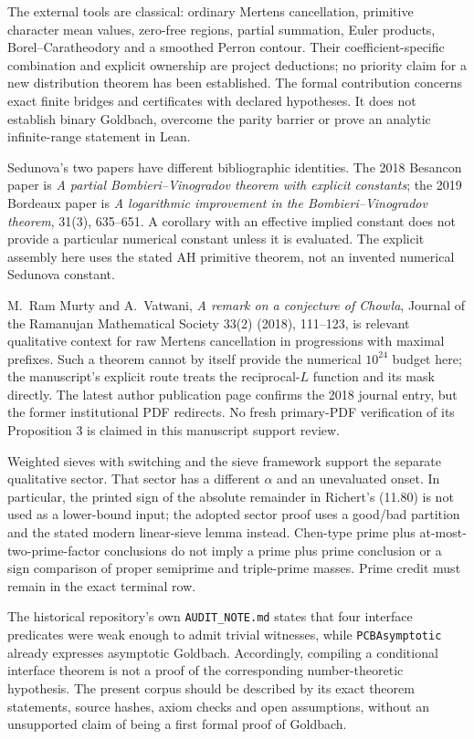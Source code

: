 \documentclass[11pt,a4paper]{article}
\theoremstyle{definition}
\theoremstyle{remark}
\begin{document}
The external tools are classical: ordinary Mertens cancellation,
primitive character mean values, zero-free regions, partial summation,
Euler products, Borel--Caratheodory and a smoothed Perron contour.
Their coefficient-specific combination and explicit ownership are
project deductions; no priority claim for a new distribution theorem
has been established. The formal contribution concerns exact finite
bridges and certificates with declared hypotheses. It does not establish
binary Goldbach, overcome the parity barrier or prove an analytic
infinite-range statement in Lean.

Sedunova's two papers have different bibliographic identities. The
2018 Besancon paper is \emph{A partial Bombieri--Vinogradov theorem
with explicit constants}; the 2019 Bordeaux paper \cite{Sedunova} is
\emph{A logarithmic improvement in the Bombieri--Vinogradov theorem},
31(3), 635--651. A corollary with an effective implied constant does
not provide a particular numerical constant unless it is evaluated.
The explicit assembly here uses the stated AH primitive theorem,
not an invented numerical Sedunova constant.

M.~Ram Murty and A.~Vatwani, \emph{A remark on a conjecture of Chowla},
Journal of the Ramanujan Mathematical Society 33(2) (2018), 111--123,
is relevant qualitative context for raw
Mertens cancellation in progressions with maximal prefixes. Such a
theorem cannot by itself provide the numerical $10^{24}$ budget here;
the manuscript's explicit route treats the reciprocal-$L$ function
and its mask directly. The latest author publication page confirms
the 2018 journal entry, but the former institutional PDF redirects.
No fresh primary-PDF verification of its Proposition 3 is claimed in
this manuscript support review.

Weighted sieves with switching \cite{MTZ} and the sieve framework
\cite{Richert} support the separate qualitative sector. That sector
has a different $\alpha$ and an unevaluated onset. In particular, the
printed sign of the absolute remainder in Richert's (11.80) is not
used as a lower-bound input; the adopted sector proof uses a good/bad
partition and the stated modern linear-sieve lemma instead. Chen-type
prime plus at-most-two-prime-factor conclusions do not imply a prime
plus prime conclusion or a sign comparison of proper semiprime and
triple-prime masses. Prime credit must remain in the exact terminal row.

The historical repository's own \texttt{AUDIT\_NOTE.md} states that
four interface predicates were weak enough to admit trivial witnesses,
while \texttt{PCBAsymptotic} already expresses asymptotic Goldbach.
Accordingly, compiling a conditional interface theorem is not a proof
of the corresponding number-theoretic hypothesis. The present corpus
should be described by its exact theorem statements, source hashes,
axiom checks and open assumptions, without an unsupported claim of
being a first formal proof of Goldbach.
\end{document}
